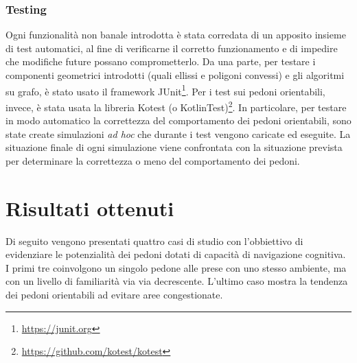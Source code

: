 \documentclass[12pt,a4paper,openright,oneside]{book}
\begin{document}
\subsection{Testing}
Ogni funzionalità non banale introdotta è stata corredata di un apposito insieme di test automatici, al fine di verificarne il corretto funzionamento e di impedire che modifiche future possano comprometterlo. Da una parte, per testare i componenti geometrici introdotti (quali ellissi e poligoni convessi) e gli algoritmi su grafo, è stato usato il framework JUnit\footnote{\url{https://junit.org}}. Per i test sui pedoni orientabili, invece, è stata usata la libreria Kotest (o KotlinTest)\footnote{\url{https://github.com/kotest/kotest}}. In particolare, per testare in modo automatico la correttezza del comportamento dei pedoni orientabili, sono state create simulazioni \emph{ad hoc} che durante i test vengono caricate ed eseguite. La situazione finale di ogni simulazione viene confrontata con la situazione prevista per determinare la correttezza o meno del comportamento dei pedoni.

\chapter{Risultati ottenuti}
\label{chap:results}
Di seguito vengono presentati quattro casi di studio con l'obbiettivo di evidenziare le potenzialità dei pedoni dotati di capacità di navigazione cognitiva. I primi tre coinvolgono un singolo pedone alle prese con uno stesso ambiente, ma con un livello di familiarità via via decrescente. L'ultimo caso mostra la tendenza dei pedoni orientabili ad evitare aree congestionate.
\end{document}
